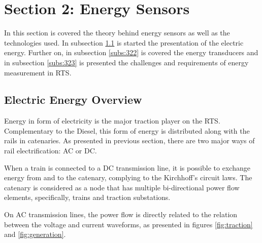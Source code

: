 


\section{Section 2: Energy Sensors}


In this section is covered the theory behind energy sensors as well as the technologies used. In subsection \ref{subs:321} is started the presentation of the electric energy. Further on, in subsection \ref{subs:322} is covered the energy transducers and in subsection \ref{subs:323} is presented the challenges and requirements of energy measurement in \ac{RTS}. 

\subsection{Electric Energy Overview}
\label{subs:321}
Energy in form of electricity is the major traction player on the \ac{RTS}. 
Complementary to the Diesel, this form of energy is distributed along with the rails in catenaries.
As presented in previous section, there are two major ways of rail electrification: \ac{AC} or \ac{DC}.

When a train is connected to a DC transmission line, it is possible to exchange energy from and to the catenary, complying to the Kirchhoff's circuit laws. The catenary is considered as a node that has multiple bi-directional power flow elements, specifically, trains and traction substations.

On \ac{AC} transmission lines, the power flow is directly related to the relation between the voltage and current waveforms, as presented in figures \ref{fig:traction} and \ref{fig:generation}.

